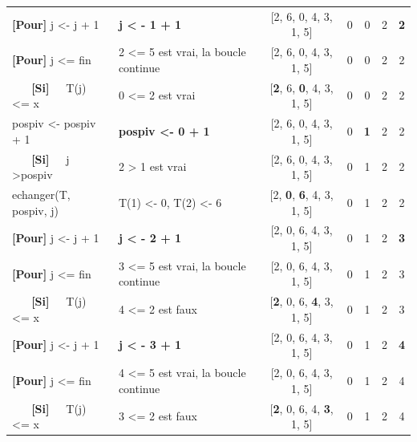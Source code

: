 \documentclass[10pt]{article} %
\newcommand{\asgold}[1]{\textcolor{mygold}{{\bf#1}}}
\newcommand{\asgr}[1]{\textcolor{mygreen}{{\bf#1}}}
\newcommand{\aspurp}[1]{\textcolor{mypurp}{{\bf#1}}}
\begin{document}
\begin{table}[h!]
\begin{tabular}{ll|ccccc}
    \asgr{[Pour]} j \textless{}- j + 1   &  \asgold{j \textless{} - 1 + 1}                            & {[}2, 6, 0, 4, 3, 1, 5{]} & 0      & 0      & 2 & \asgold{2} \\
    \asgr{[Pour]} j \textless{}= fin      & 2 \textless{}= 5 est vrai, la boucle continue                 & {[}2, 6, 0, 4, 3, 1, 5{]} & 0      & 0      & 2 & 2 \\
    \asgr{\ \ \ [Si]\ \ } T(j) \textless{}= x       & \cellcolor{mypurp} 0 \textless{}= 2 est vrai                                     & {[}\aspurp{2}, 6, \aspurp{0}, 4, 3, 1, 5{]} & 0      & 0      & 2 & 2 \\
    pospiv \textless{}- pospiv + 1 &         \asgold{pospiv \textless{}- 0 + 1}                                                      & {[}2, 6, 0, 4, 3, 1, 5{]} & 0      & \asgold{1}      & 2 & 2 \\
    \asgr{\ \ \ [Si]\ \ } j \textgreater pospiv     & 2 \textgreater{} 1 est vrai                                     & {[}2, 6, 0, 4, 3, 1, 5{]} & 0      & 1      & 2 & 2 \\
    echanger(T, pospiv, j)         &  \cellcolor{mygold}T(1) \textless{}- 0, T(2) \textless{}- 6                                         & {[}2, \asgold{0}, \asgold{6}, 4, 3, 1, 5{]} & 0      & 1      & 2 & 2 \\
    \asgr{[Pour]} j \textless{}- j + 1   &  \asgold{j \textless{} - 2 + 1}                             & {[}2, 0, 6, 4, 3, 1, 5{]} & 0      & 1      & 2 & \asgold{3} \\
    \asgr{[Pour]} j \textless{}= fin      & 3 \textless{}= 5 est vrai, la boucle continue                 & {[}2, 0, 6, 4, 3, 1, 5{]} & 0      & 1      & 2 & 3 \\
    \asgr{\ \ \ [Si]\ \ } T(j) \textless{}= x       & \cellcolor{mypurp} 4 \textless{}= 2 est faux                                     & {[}\aspurp{2}, 0, 6, \aspurp{4}, 3, 1, 5{]} & 0      & 1      & 2 & 3 \\
    \asgr{[Pour]} j \textless{}- j + 1   &  \asgold{j \textless{} - 3 + 1}                             & {[}2, 0, 6, 4, 3, 1, 5{]} & 0      & 1      & 2 & \asgold{4} \\
    \asgr{[Pour]} j \textless{}= fin      & 4 \textless{}= 5 est vrai, la boucle continue                 & {[}2, 0, 6, 4, 3, 1, 5{]} & 0      & 1      & 2 & 4 \\
    \asgr{\ \ \ [Si]\ \ } T(j) \textless{}= x       & \cellcolor{mypurp} 3 \textless{}= 2 est faux                                     & {[}\aspurp{2}, 0, 6, 4, \aspurp{3}, 1, 5{]} & 0      & 1      & 2 & 4 \\

\end{tabular}
\end{table}
\end{document}
